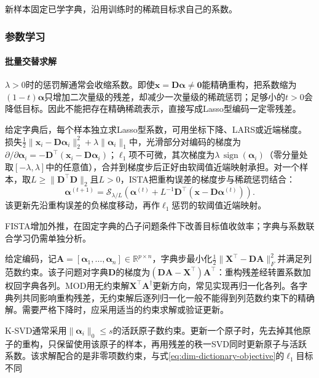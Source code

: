 新样本固定已学字典，沿用训练时的稀疏目标求自己的系数。

\subsubsection{参数学习}
\label{sec:dim-sparse-coding-learning}

\paragraph{批量交替求解}

$\lambda>0$时的惩罚解通常会收缩系数。即使$\bm x=\bm D\bm\alpha\ne\bm0$能精确重构，把系数缩为$(1-t)\bm\alpha$只增加二次量级的残差，却减少一次量级的稀疏惩罚；足够小的$t>0$会降低目标。因此不能把存在精确稀疏表示，直接写成Lasso型编码一定零残差。

给定字典后，每个样本独立求Lasso型系数，可用坐标下降、LARS或近端梯度。损失$\frac12\lVert\bm{x}_i-\bm{D}\bm{\alpha}_i\rVert_2^2+\lambda\lVert\bm{\alpha}_i\rVert_1$中，光滑部分对编码的梯度为$\partial/\partial\bm{\alpha}_i=-\bm{D}^{\top}(\bm{x}_i-\bm{D}\bm{\alpha}_i)$；$\ell_1$项不可微，其次梯度为$\lambda\,\operatorname{sign}(\bm{\alpha}_i)$（零分量处取$[-\lambda,\lambda]$中的任意值），合并到梯度步后正好由软阈值近端映射承担。对一个样本，取$L\geq\lVert\bm{D}^{\top}\bm{D}\rVert_2$且$L>0$，ISTA把重构误差的梯度步与稀疏惩罚结合：
\begin{equation}
  \bm{\alpha}^{(t+1)}
  =\mathcal{S}_{\lambda/L}\left(
      \bm{\alpha}^{(t)}
      +L^{-1}\bm{D}^{\top}
          (\bm{x}-\bm{D}\bm{\alpha}^{(t)})\right).
  \label{eq:dim-ista}
\end{equation}
该更新先沿重构误差的负梯度移动，再作$\ell_1$惩罚的软阈值近端映射。

FISTA增加外推，在固定字典的凸子问题条件下改善目标值收敛率；字典与系数联合学习仍需单独分析。

给定编码，记$\bm{A}=[\bm{\alpha}_1,\ldots,\bm{\alpha}_n]\in\mathbb{R}^{p\times n}$，字典步最小化$\frac12\lVert\bm{X}^{\top}-\bm{D}\bm{A}\rVert_F^2$并满足列范数约束。该子问题对字典$\bm{D}$的梯度为$(\bm{D}\bm{A}-\bm{X}^{\top})\bm{A}^{\top}$：重构残差经转置系数加权回字典各列。MOD用无约束解$\bm{X}^{\top}\bm{A}^{\dagger}$更新方向，常见实现再归一化各列。各字典列共同影响重构残差，无约束解后逐列归一化一般不能得到列范数约束下的精确解。需要严格下降时，应采用适当的约束求解或验证更新。

K-SVD通常采用$\lVert\bm{\alpha}_i\rVert_0\leq s$的活跃原子数约束。更新一个原子时，先去掉其他原子的重构，只保留使用该原子的样本，再用残差的秩一SVD同时更新原子与活跃系数。该求解配合的是非零项数约束，与式\eqref{eq:dim-dictionary-objective}的$\ell_1$目标不同

